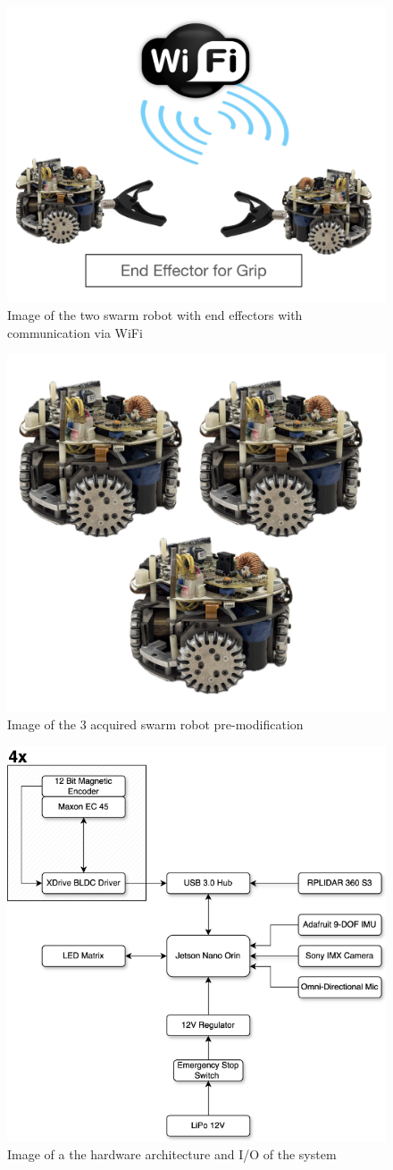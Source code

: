 \begin{figure}
    \centering
    \includegraphics[width=0.5\linewidth]{assets/images/hardware/endeffector.png}
    \caption{Image of the two swarm robot with end effectors with communication via WiFi}
    \label{fig:effector-2-robot}
\end{figure}
\begin{figure}
    \centering
    \includegraphics[width=0.5\linewidth]{assets/images/hardware/3swarmrobots.png}
    \caption{Image of the 3 acquired swarm robot pre-modification}
    \label{fig:3-robot}
\end{figure}\begin{figure}
    \centering
    \includegraphics[width=0.75\linewidth]{midpoint_report/assets/images/hardware/hardware-architecture.png}
    \caption{Image of a the hardware architecture and I/O of the system}
    \label{fig:hardware-arch}
\end{figure}

